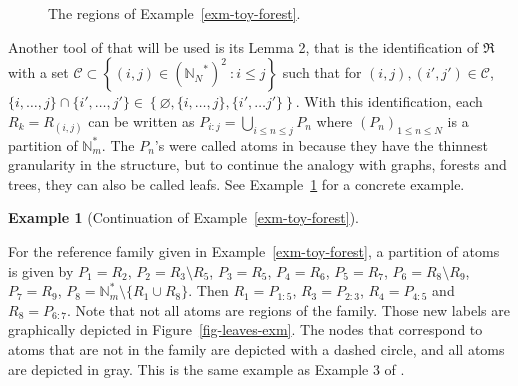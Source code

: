 \documentclass[
  11pt,
  a4paper,
]{article}
\theoremstyle{plain}
\theoremstyle{plain}
\theoremstyle{plain}
\theoremstyle{definition}
\theoremstyle{definition}
\newtheorem{example}{Example}[section]
\theoremstyle{remark}
\begin{document}
\begin{figure}


\caption{\label{fig-forest-exm}The regions of
Example~\ref{exm-toy-forest}.}

\end{figure}%

Another tool of \citet{MR4178188} that will be used is its Lemma 2, that
is the identification of \(\mathfrak{R}\) with a set
\(\mathcal C\subset \left\{(i,j)\in \left({\mathbb N_N}^*\right)^2 \: : i\leq j\right\}\)
such that for \((i,j), (i',j')\in\mathcal C\),
\(\{i,\dotsc, j\}\cap\{i',\dotsc,j'\}\in\left\{\varnothing, \{i,\dotsc, j\},\{i',\dotsc j'\}  \right\}\).
With this identification, each \(R_k=R_{(i,j)}\) can be written as
\(P_{i:j}=\bigcup_{i\leq n\leq j}P_n\) where \((P_n)_{1\leq n \leq N}\)
is a partition of \(\mathbb{N}_m^*\). The \(P_n\)'s were called atoms in
\citet{MR4178188} because they have the thinnest granularity in the
structure, but to continue the analogy with graphs, forests and trees,
they can also be called leafs. See Example~\ref{exm-toy-leaves} for a
concrete example.

\begin{example}[Continuation of
Example~\ref{exm-toy-forest}]\protect\hypertarget{exm-toy-leaves}{}\label{exm-toy-leaves}

For the reference family given in Example~\ref{exm-toy-forest}, a
partition of atoms is given by \(P_1 =R_2\),
\(P_2  =   R_3\setminus R_5\), \(P_3  =   R_5\), \(P_4=R_6\),
\(P_5=R_7\), \(P_6=R_8\setminus R_9\), \(P_7=R_9\),
\(P_8=\mathbb{N}_m^* \setminus \{R_1 \cup R_8 \}\). Then
\(R_1=P_{1:5}\), \(R_3=P_{2:3}\), \(R_4=P_{4:5}\) and \(R_8=P_{6:7}\).
Note that not all atoms are regions of the family. Those new labels are
graphically depicted in Figure~\ref{fig-leaves-exm}. The nodes that
correspond to atoms that are not in the family are depicted with a
dashed circle, and all atoms are depicted in gray. This is the same
example as Example 3 of \citet{MR4178188}.

\end{example}
\end{document}
